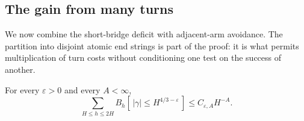 \subsection{The gain from many turns}
We now combine the short-bridge deficit with adjacent-arm avoidance.
The partition into disjoint atomic end strings is part of the proof: it
is what permits multiplication of turn costs without conditioning one
test on the success of another.

\begin{theorem}\label{09_fast_paths:fast-bridges}
For every \(\varepsilon>0\) and every \(A<\infty\),
\begin{equation}
 \sum_{H\le h\le2H}
 B_h[\,|\gamma|\le H^{4/3-\varepsilon}\,]
       \le C_{\varepsilon,A}H^{-A}.
                  \label{eq:F-33b}
\end{equation}
\end{theorem}
